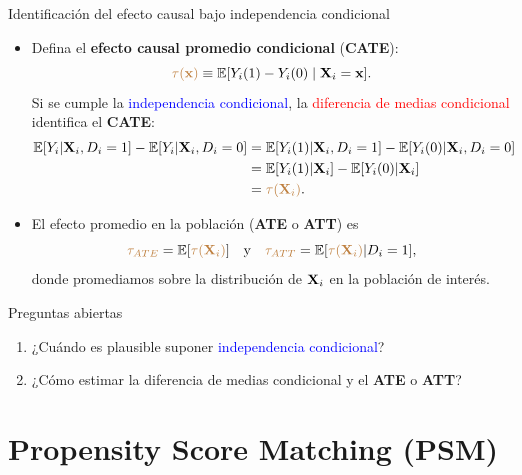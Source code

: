 \documentclass[10pt, xcolor=dvipsnames]{beamer}
\begin{document}
\begin{frame}{Identificación del efecto causal bajo independencia condicional}
\begin{itemize}
    \item Defina el \textbf{efecto causal promedio condicional} (\textbf{CATE}):
    \[
       \textcolor{brown}{\tau(\textbf{x})} \equiv \operatorname{\mathbb{E}}[Y_i(1) - Y_i(0) \mid \textbf{X}_i = \textbf{x}].
    \]
    Si se cumple la \textcolor{blue}{independencia condicional}, la \textcolor{red}{diferencia de medias condicional} identifica el \textbf{CATE}:
    {\fontvid
    \begin{align*}
    \begin{split}
        \operatorname{\mathbb{E}}[Y_i | \textbf{X}_i, D_i=1] - \operatorname{\mathbb{E}}[Y_i | \textbf{X}_i, D_i=0] &= \operatorname{\mathbb{E}}[Y_i(1) | \textbf{X}_i, D_i=1] - \operatorname{\mathbb{E}}[Y_i(0) | \textbf{X}_i, D_i=0] \\
        &= \operatorname{\mathbb{E}}[Y_i(1) | \textbf{X}_i] - \operatorname{\mathbb{E}}[Y_i(0) | \textbf{X}_i] \\
        &= \textcolor{brown}{\tau(\textbf{X}_i)}.
    \end{split}
    \end{align*}
    }
    \item El efecto promedio en la población (\textbf{ATE} o \textbf{ATT}) es
    \[
       \textcolor{brown}{\tau_{ATE}} = \operatorname{\mathbb{E}}[\textcolor{brown}{\tau(\textbf{X}_i)}] \quad \text{y} \quad \textcolor{brown}{\tau_{ATT}} = \operatorname{\mathbb{E}}[\textcolor{brown}{\tau(\textbf{X}_i)} | D_i = 1],
    \]
    donde promediamos sobre la distribución de \(\textbf{X}_i\) en la población de interés.
\end{itemize}    
\end{frame}


\begin{frame}{Preguntas abiertas}
\begin{enumerate}
    \item ¿Cuándo es plausible suponer \textcolor{blue}{independencia condicional}?
    \vspace{1em}
    \item ¿Cómo estimar la diferencia de medias condicional y el \textbf{ATE} o \textbf{ATT}?
\end{enumerate}    
\end{frame}


\section{Propensity Score Matching (PSM)}
\end{document}
